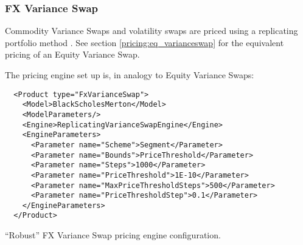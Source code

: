 \subsubsection{FX Variance Swap}
\label{pricing:fx_varianceswap}

Commodity Variance Swaps and volatility swaps are priced using a replicating portfolio method
\cite{Variance_Swaps_JP_Morgan}.  See section \ref{pricing:eq_varianceswap} for the equivalent pricing of an Equity
Variance Swap.

The pricing engine set up is, in analogy to Equity Variance Swaps:

\begin{listing}[h]
\begin{verbatim}
  <Product type="FxVarianceSwap">
    <Model>BlackScholesMerton</Model>
    <ModelParameters/>
    <Engine>ReplicatingVarianceSwapEngine</Engine>
    <EngineParameters>
      <Parameter name="Scheme">Segment</Parameter>
      <Parameter name="Bounds">PriceThreshold</Parameter>
      <Parameter name="Steps">1000</Parameter>
      <Parameter name="PriceThreshold">1E-10</Parameter>
      <Parameter name="MaxPriceThresholdSteps">500</Parameter>
      <Parameter name="PriceThresholdStep">0.1</Parameter>
    </EngineParameters>
  </Product>
\end{verbatim}
\caption{``Robust'' FX Variance Swap pricing engine configuration.}
\end{listing}

